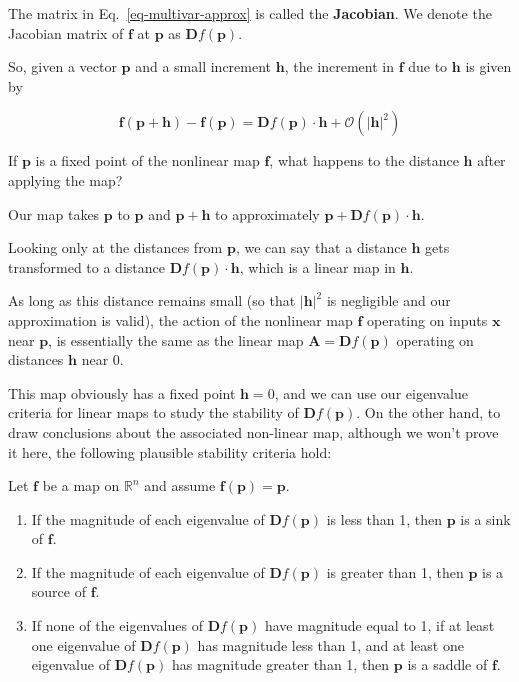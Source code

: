 The matrix in Eq.~\ref{eq-multivar-approx} is called the \textbf{Jacobian}. We denote the Jacobian matrix of ${\mathbf f}$ at ${\mathbf p}$ as ${\mathbf Df}({\mathbf p})$.

So, given a vector ${\mathbf p}$ and a small increment ${\mathbf h}$, the increment in ${\mathbf f}$ due to ${\mathbf h}$ is given by

\begin{equation}
{\mathbf f}({\mathbf p} + {\mathbf h}) - {\mathbf f}({\mathbf p}) = {\mathbf Df}({\mathbf p}) \cdot {\mathbf h} + \mathcal{O}\left(|{\mathbf h}|^2\right)
\end{equation} 

\begin{cue}
If $\mathbf p$ is a fixed point of the nonlinear map $\mathbf f$, what happens to the distance $\mathbf h$ after applying the map?
\end{cue}

Our map takes $\mathbf p$ to $\mathbf p$ and ${\mathbf p} + {\mathbf h}$ to approximately $\mathbf p + {\mathbf Df}({\mathbf p}) \cdot {\mathbf h}$.

Looking only at the distances from $\mathbf p$, we can say that a distance $\mathbf h$  gets transformed to a distance  ${\mathbf Df}({\mathbf p}) \cdot {\mathbf h}$, which is a linear map in $\mathbf h$. 

As long as this distance remains small (so that $|{\mathbf h}|^2$ is negligible and our approximation is valid), the action of the nonlinear map $\mathbf f$ operating on inputs $\mathbf x$ near ${\mathbf p}$, is essentially the same as the linear map ${\mathbf A} = {\mathbf Df}({\mathbf p})$ operating on distances $\mathbf h$ near 0.

This map obviously has a fixed point ${\mathbf h} = 0$, and we can use our eigenvalue criteria for linear maps to study the stability of ${\mathbf Df}({\mathbf p})$. On the other hand, to draw conclusions about the associated non-linear map, although we won't prove it here, the following plausible stability criteria hold:

Let ${\mathbf f}$ be a map on $\mathbb{R}^n$ and assume ${\mathbf f}({\mathbf p})={\mathbf p}$.

\begin{enumerate}
\item
If the magnitude of each eigenvalue of ${\mathbf Df}({\mathbf p})$ is less than 1, then ${\mathbf p}$ is a sink of ${\mathbf f}$.
\item
If the magnitude of each eigenvalue of ${\mathbf Df}({\mathbf p})$ is greater than 1, then ${\mathbf p}$ is a source of ${\mathbf f}$.
\item
\noindent{}If none of the eigenvalues of ${\mathbf Df}({\mathbf p})$ have magnitude equal to 1, if at least one eigenvalue of ${\mathbf Df}({\mathbf p})$ has magnitude less than 1, and at least one eigenvalue of ${\mathbf Df}({\mathbf p})$ has magnitude greater than 1, then ${\mathbf p}$ is a saddle of ${\mathbf f}$.
\end{enumerate}

